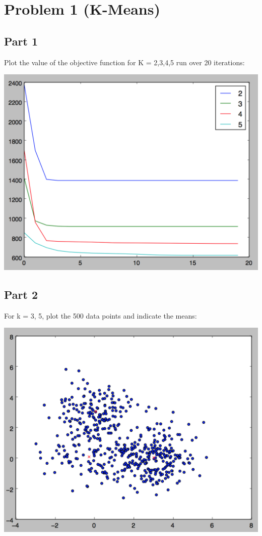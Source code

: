 \documentclass[11pt]{article}
\begin{document}

\section*{Problem 1 (K-Means)}

\subsection*{Part 1}

Plot the value of the objective function for K = 2,3,4,5 run over 20 iterations:
	
\includegraphics[scale=.5]{images/km_objective.png}

\subsection*{Part 2}

For k = 3, 5, plot the 500 data points and indicate the means:
		
\includegraphics[scale=.5]{images/k3}
\end{document}
